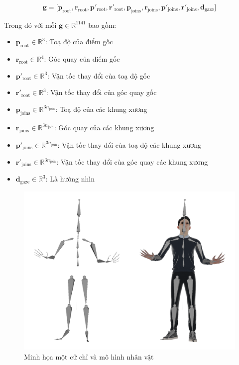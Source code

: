 $$
\mathbf{g} = \Big[ \mathbf{p}_{\text{root}},  \mathbf{r}_{\text{root}},
\mathbf{ p }'_{\text{root}},  \mathbf{r}'_{\text{root}},
\mathbf{p}_{\text{joins}},  \mathbf{r}_{\text{joins}},
\mathbf{p}'_{\text{joins}},  \mathbf{r}'_{\text{joins}},
\mathbf{d}_{\text{gaze}}
\Big]
$$

Trong  đó với mỗi $\mathbf{g} \in \mathbb{R}^{1141}$ bao gồm:
\begin{itemize}
	\item $\mathbf{p}_{\text{root}} \in \mathbb{R}^3$: Toạ độ của điểm gốc
	\item $\mathbf{r}_{\text{root}} \in \mathbb{R}^4$: Góc quay của điểm gốc
	\item $\mathbf{p}'_{\text{root}} \in \mathbb{R}^3$: Vận tốc thay đổi của toạ độ gốc
	\item $\mathbf{r}'_{\text{root}} \in \mathbb{R}^3$: Vận tốc thay đổi của góc quay gốc
	
	\item $\mathbf{p}_{\text{joins}} \in \mathbb{R}^{3 n_{\text{join} }}$: Toạ độ của các khung xương
	\item $\mathbf{r}_{\text{joins}} \in \mathbb{R}^{3 n_{\text{join} }}$: Góc quay của các khung xương
	\item $\mathbf{p}'_{\text{joins}} \in \mathbb{R}^{3n_{\text{join} }}$: Vận tốc thay đổi của toạ độ các khung xương
	\item $\mathbf{r}'_{\text{joins}} \in \mathbb{R}^{3n_{\text{join} }}$: Vận tốc thay đổi của góc quay các khung xương
	
	\item $\mathbf{d}_{\text{gaze}} \in \mathbb{R}^3$: Là hướng nhìn
\end{itemize}

\begin{figure}
	\centering
	\includegraphics[width=0.8\linewidth]{images/skeleton_sample.png}
	\caption{Minh họa một cử chỉ và mô hình nhân vật}
	\label{fig:software}
\end{figure}

